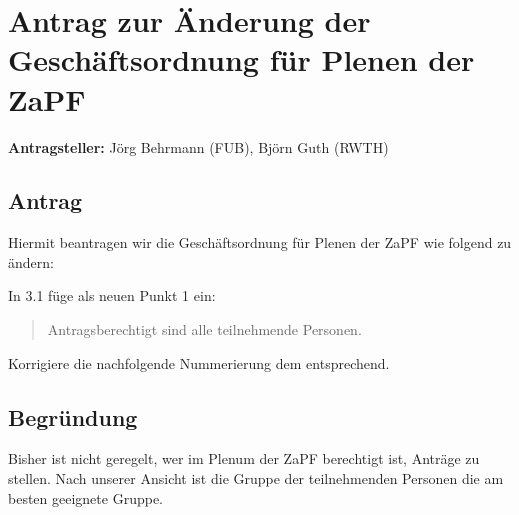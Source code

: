 \documentclass[draft,10pt,oneside]{scrartcl}
\begin{document}
\section*{Antrag zur Änderung der Geschäftsordnung für Plenen der ZaPF}

\textbf{Antragsteller:} Jörg Behrmann (FUB), Björn Guth (RWTH)

\subsection*{Antrag}

Hiermit beantragen wir die Geschäftsordnung für Plenen der ZaPF wie folgend zu
ändern:

In 3.1 füge als neuen Punkt 1 ein:
\begin{quote}
	Antragsberechtigt sind alle teilnehmende Personen.
\end{quote}
Korrigiere die nachfolgende Nummerierung dem entsprechend.

\subsection*{Begründung}
Bisher ist nicht geregelt, wer im Plenum der ZaPF berechtigt ist, Anträge zu
stellen. Nach unserer Ansicht ist die Gruppe der teilnehmenden Personen die am
besten geeignete Gruppe.
\end{document}
